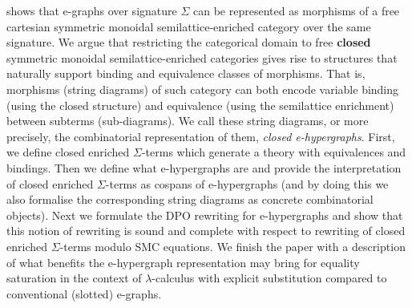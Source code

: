 \citet{ghica2024equivalencehypergraphsegraphsmonoidal} shows that e-graphs over signature $\Sigma$ can be represented as morphisms of a free cartesian symmetric monoidal semilattice-enriched category over the same signature.
We argue that restricting the categorical domain to free \textbf{closed} symmetric monoidal semilattice-enriched categories gives rise to structures that naturally support binding and equivalence classes of morphisms.
That is, morphisms (string diagrams) of such category can both encode variable binding (using the closed structure) and equivalence (using the semilattice enrichment) between subterms (sub-diagrams).
We call these string diagrams, or more precisely, the combinatorial representation of them, \emph{closed e-hypergraphs}.
First, we define closed enriched $\Sigma$-terms which generate a theory with equivalences and bindings.
Then we define what e-hypergraphs are and provide the interpretation of closed enriched $\Sigma$-terms as cospans of e-hypergraphs (and by doing this we also formalise the corresponding string diagrams as concrete combinatorial objects).
Next we formulate the DPO rewriting for e-hypergraphs and show that this notion of rewriting is sound and complete with respect to rewriting of closed enriched $\Sigma$-terms modulo SMC equations.
We finish the paper with a description of what benefits the e-hypergraph representation may bring for equality saturation in the context of $\lambda$-calculus with explicit substitution compared to conventional (slotted) e-graphs.


